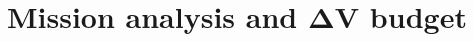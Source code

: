 \section
[\case{Mission analysis and \texorpdfstring{$\boldsymbol{\Delta V}$}{Delta-V} budget}
{Mission analysis and \texorpdfstring{$\Delta V$}{Delta-V} budget}]
{Mission analysis and \texorpdfstring{$\boldsymbol{\Delta V}$}{Delta-V} budget}
\label{sec:ma_and_dv}

